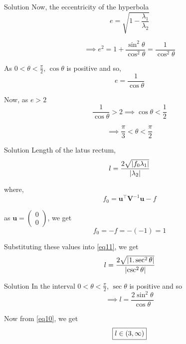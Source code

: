 \documentclass{beamer}
\let\vec\mathbf
\DeclarePairedDelimiter{\abs}{\lvert}{\rvert}
\theoremstyle{remark}
\newcommand{\myvec}[1]{\ensuremath{\begin{pmatrix}#1\end{pmatrix}}}
\begin{document}
\begin{frame}{Solution}
Now, the eccentricity of the hyperbola
\begin{equation}
    e = \sqrt{1 - \frac{\lambda_1}{\lambda_2}}
\end{equation}

\begin{equation}
    \implies e^2 = 1 + \frac{\sin^2{\theta}}{\cos^2{\theta}} = \frac{1}{\cos^2{\theta}}
\end{equation}

As $0 < \theta < \frac{\pi}{2}$, $\cos{\theta}$ is positive and so,
\begin{equation}
    e = \frac{1}{\cos{\theta}}
\end{equation}

Now, as $e > 2$
\begin{equation}
    \frac{1}{\cos{\theta}} > 2 \implies \cos{\theta} < \frac{1}{2}
\end{equation}

\begin{equation}
    \implies \frac{\pi}{3} < \theta < \frac{\pi}{2}
    \label{eq10}
\end{equation}
\end{frame}

\begin{frame}{Solution}
Length of the latus rectum,
\begin{equation}
    l = \frac{2\sqrt{\abs{f_0\lambda_1}}}{\abs{\lambda_2}}
    \label{eq11}
\end{equation}

where,
\begin{equation}
    f_0 = \vec{u}^{\top}\vec{V}^{-1}\vec{u} - f
\end{equation}

as $\vec{u} = \myvec{0\\0}$, we get
\begin{equation}
    f_0 = -f = -(-1) = 1
\end{equation}

Substituting these values into \eqref{eq11}, we get
\begin{equation}
    l = \frac{2\sqrt{\abs{1.\sec^2\theta}}}{\abs{\csc^2\theta}}
\end{equation}
\end{frame}

\begin{frame}{Solution}
    In the interval $0 < \theta < \frac{\pi}{2}$, $\sec\theta$ is positive and so
\begin{equation}
    \implies l = \frac{2\sin^2{\theta}}{\cos{\theta}}
\end{equation}

Now from \eqref{eq10}, we get
\begin{equation}
    \fbox{$l \in (3,\infty)$}
\end{equation}
\end{frame}
\end{document}
